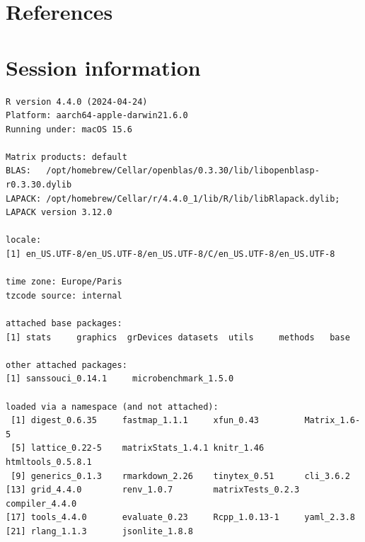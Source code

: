\documentclass[
  11pt,
  a4paper,
]{article}
\theoremstyle{plain}
\theoremstyle{definition}
\theoremstyle{plain}
\theoremstyle{definition}
\theoremstyle{plain}
\theoremstyle{remark}
\begin{document}
\section*{References}\label{references}

\renewcommand{\bibsection}{}


\section*{Session information}\label{session-information}

\begin{verbatim}
R version 4.4.0 (2024-04-24)
Platform: aarch64-apple-darwin21.6.0
Running under: macOS 15.6

Matrix products: default
BLAS:   /opt/homebrew/Cellar/openblas/0.3.30/lib/libopenblasp-r0.3.30.dylib 
LAPACK: /opt/homebrew/Cellar/r/4.4.0_1/lib/R/lib/libRlapack.dylib;  LAPACK version 3.12.0

locale:
[1] en_US.UTF-8/en_US.UTF-8/en_US.UTF-8/C/en_US.UTF-8/en_US.UTF-8

time zone: Europe/Paris
tzcode source: internal

attached base packages:
[1] stats     graphics  grDevices datasets  utils     methods   base     

other attached packages:
[1] sanssouci_0.14.1     microbenchmark_1.5.0

loaded via a namespace (and not attached):
 [1] digest_0.6.35     fastmap_1.1.1     xfun_0.43         Matrix_1.6-5     
 [5] lattice_0.22-5    matrixStats_1.4.1 knitr_1.46        htmltools_0.5.8.1
 [9] generics_0.1.3    rmarkdown_2.26    tinytex_0.51      cli_3.6.2        
[13] grid_4.4.0        renv_1.0.7        matrixTests_0.2.3 compiler_4.4.0   
[17] tools_4.4.0       evaluate_0.23     Rcpp_1.0.13-1     yaml_2.3.8       
[21] rlang_1.1.3       jsonlite_1.8.8   
\end{verbatim}
\end{document}
